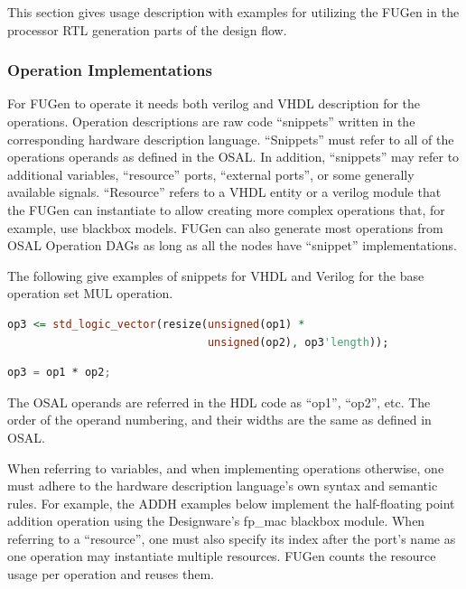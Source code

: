 \documentclass[a4paper,twoside]{tceusermanual}
\begin{document}
This section gives usage description with examples for utilizing the
FUGen in the processor RTL generation parts of the design flow.

\subsubsection{Operation Implementations}

For FUGen to operate it needs both verilog and VHDL description for
the operations. Operation descriptions are raw code ``snippets''
written in the corresponding hardware description
language. ``Snippets'' must refer to all of the operations operands as
defined in the OSAL. In addition, ``snippets'' may refer to additional
variables, ``resource'' ports, ``external ports'', or some generally
available signals. ``Resource'' refers to a VHDL entity or a verilog
module that the FUGen can instantiate to allow creating more complex
operations that, for example, use blackbox models. FUGen can also
generate most operations from OSAL Operation DAGs as long as all the
nodes have ``snippet'' implementations.



The following give examples of snippets for VHDL and Verilog for the
base operation set MUL operation.

\begin{lstlisting}[language=VHDL,caption={VHDL ``snippet'' for MUL operation}]
op3 <= std_logic_vector(resize(unsigned(op1) *
                               unsigned(op2), op3'length));
\end{lstlisting}

\begin{lstlisting}[language=Verilog,caption={Verilog ``snippet'' for MUL operation}]
op3 = op1 * op2;
\end{lstlisting}

The OSAL operands are referred in the HDL code as ``op1'', ``op2'',
etc. The order of the operand numbering, and their widths are the same as defined
in OSAL.

When referring to variables, and when implementing operations otherwise, one
must adhere to the hardware description language's own syntax and semantic rules.
For example, the ADDH examples below implement the half-floating point
addition operation using the Designware's fp\_mac blackbox module. When referring to
a ``resource'', one must also specify its index after the port's name as one operation
may instantiate multiple resources. FUGen counts the resource usage per
operation and reuses them.
\end{document}
